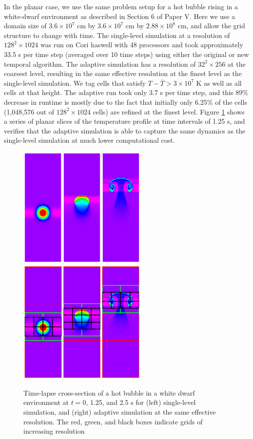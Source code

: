 In the planar case, we use the same problem setup for a hot bubble rising in a white-dwarf environment as described in Section 6 of Paper V. Here we use a domain size of $3.6\times 10^7$ cm by $3.6\times 10^7$ cm by $2.88\times 10^8$ cm, and allow the grid structure to change with time. The single-level simulation at a resolution of $128^2 \times 1024$ was run on Cori haswell with 48 processors and took approximately 33.5 s per time step (averaged over 10 time steps) using either the original or new temporal algorithm. The adaptive simulation has a resolution of $32^2 \times 256$ at the coarsest level, resulting in the same effective resolution at the finest level as the single-level simulation. We tag cells that satisfy $T-\bar{T} > 3\times 10^7$ K as well as all cells at that height. The adaptive run took only 3.7 s per time step, and this 89\% decrease in runtime is mostly due to the fact that initially only 6.25\% of the cells (1,048,576 out of $128^2 \times 1024$ cells) are refined at the finest level. Figure \ref{fig:bubble_results} shows a series of planar slices of the temperature profile at time intervals of 1.25 s, and verifies that the adaptive simulation is able to capture the same dynamics as the single-level simulation at much lower computational cost.

\begin{figure}[htb]
\begin{center}
\includegraphics[width=2.5in]{./figs/reacting_bubble_result} \hspace{2.5em}
\includegraphics[width=2.5in]{./figs/reacting_bubble_amr_result}
\caption{\label{fig:bubble_results} Time-lapse cross-section of a hot bubble in a white dwarf environment at
         $t = 0$, 1.25, and 2.5 s for (left) single-level simulation, and
         (right) adaptive simulation at the same effective resolution.  The red, green, and black boxes indicate grids of increasing resolution}
\end{center}
\end{figure}

